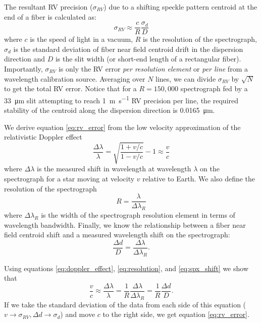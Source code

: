 \documentclass[twocolumn]{emulateapj}
\begin{document}
The resultant RV precision ($\sigma_{RV}$) due to a shifting speckle pattern centroid at the end of a fiber is calculated as:
\begin{equation}
\sigma_{RV} \approx \frac{c}{R} \frac{\sigma_d}{D}
\label{eq:rv_error}
\end{equation}
where $c$ is the speed of light in a vacuum, $R$ is the resolution of the spectrograph, $\sigma_d$ is the standard deviation of fiber near field centroid drift in the dispersion direction and $D$ is the slit width (or short-end length of a rectangular fiber). Importantly, $\sigma_{RV}$ is only the RV error \textit{per resolution element} or \textit{per line} from a wavelength calibration source. Averaging over $N$ lines, we can divide $\sigma_{RV}$ by $\sqrt{N}$ to get the total RV error. Notice that for a $R=150,000$ spectrograph fed by a \SI{33}{\micro\meter} slit attempting to reach \SI{1}{\meter\per\second} RV precision per line, the required stability of the centroid along the dispersion direction is \SI{0.0165}{\micro\meter}.

We derive equation \ref{eq:rv_error} from the low velocity approximation of the relativistic Doppler effect
\begin{equation}
\frac{\Delta \lambda}{\lambda} = \sqrt{\frac{1 + v/c}{1-v/c}} - 1 \approx \frac{v}{c}
\label{eq:doppler_effect}
\end{equation}
where $\Delta \lambda$ is the measured shift in wavelength at wavelength $\lambda$ on the spectrograph for a star moving at velocity $v$ relative to Earth. We also define the resolution of the spectrograph
\begin{equation}
R = \frac{\lambda}{\Delta \lambda_R}
\label{eq:resolution}
\end{equation}
where $\Delta \lambda_R$ is the width of the spectrograph resolution element in terms of wavelength bandwidth. Finally, we know the relationship between a fiber near field centroid shift and a measured wavelength shift on the spectrograph:
\begin{equation}
\frac{\Delta d}{D} = \frac{\Delta \lambda}{\Delta \lambda_R}.
\label{eq:spx_shift}
\end{equation}

Using equations \ref{eq:doppler_effect}, \ref{eq:resolution}, and \ref{eq:spx_shift} we show that
\begin{equation}
\frac{v}{c} \approx \frac{\Delta \lambda}{\lambda} = \frac{1}{R} \frac{\Delta \lambda}{\Delta \lambda_R} = \frac{1}{R} \frac{\Delta d}{D}.
\end{equation}
If we take the standard deviation of the data from each side of this equation ($v \rightarrow \sigma_{RV}, \Delta d \rightarrow \sigma_d$) and move $c$ to the right side, we get equation \ref{eq:rv_error}.
\end{document}
